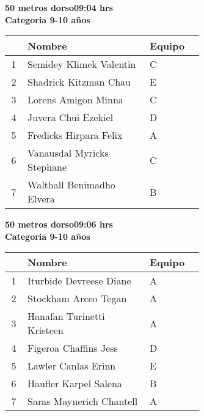 \begin{minipage}{0.95\linewidth}\vspace{0.5cm} 
\begin{flushleft}
\textbf{
\hspace{-0.15cm}50 metros dorso\hspace{1.5cm}09:04 hrs \\Categoria 9-10 años}\vspace{-0.2cm} 
\end{flushleft}
\begin{tabular}{cp{0.63\linewidth}l}
\hline
& \textbf{Nombre} & \textbf{Equipo} \\ \hline
1 & Semidey Klimek Valentin & C \\ 
2 & Shadrick Kitzman Chau & E \\ 
3 & Lorens Amigon Minna & C \\ 
4 & Juvera Chui Ezekiel & D \\ 
5 & Fredicks Hirpara Felix & A \\ 
6 & Vanausdal Myricks Stephane & C \\ 
7 & Walthall Benimadho Elvera & B \\ 
\end{tabular}
\end{minipage}
\begin{minipage}{0.95\linewidth}\vspace{0.5cm} 
\begin{flushleft}
\textbf{
\hspace{-0.15cm}50 metros dorso\hspace{1.5cm}09:06 hrs \\Categoria 9-10 años}\vspace{-0.2cm} 
\end{flushleft}
\begin{tabular}{cp{0.63\linewidth}l}
\hline
& \textbf{Nombre} & \textbf{Equipo} \\ \hline
1 & Iturbide Devreese Diane & A \\ 
2 & Stockham Arceo Tegan & A \\ 
3 & Hanafan Turinetti Kristeen & A \\ 
4 & Figeroa Chaffins Jess & D \\ 
5 & Lawler Canlas Erinn & E \\ 
6 & Haufler Karpel Salena & B \\ 
7 & Saras Maynerich Chantell & A \\ 
\end{tabular}
\end{minipage}
